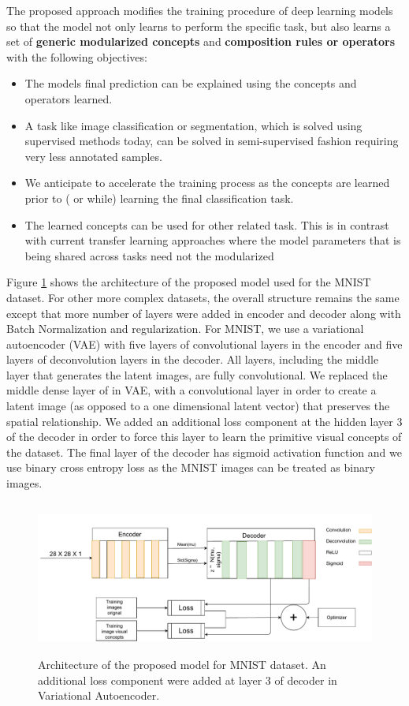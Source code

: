 \documentclass{JMLFS}
\begin{document}
The proposed approach modifies the training procedure of deep learning models so that the model not only learns to perform the specific task,  but also learns a set of \textbf{generic modularized concepts} and \textbf{composition rules or operators} with the following objectives:
\begin{itemize}
\item The models final prediction can be explained using the concepts and operators learned.
\item A task like image classification or segmentation, which is solved using supervised methods today, can be solved in semi-supervised fashion requiring very less annotated samples.
\item We anticipate to accelerate the training process as the concepts are learned prior to ( or while) learning the final classification task.
\item The learned concepts can be used for other related task. This is in contrast with current transfer learning approaches where the model parameters that is being shared across tasks need not the modularized
\end{itemize}

Figure \ref{f:cnn_arch} shows the architecture of the proposed model used for the MNIST dataset.
For other more complex datasets, the overall structure remains the same except that more number of layers were added in encoder and decoder along with Batch Normalization \cite{ioffe2015} and regularization.
For MNIST, we use a variational autoencoder (VAE) with five layers of convolutional layers in the encoder and five layers of deconvolution layers in the decoder.
All layers, including the middle layer that generates the latent images, are fully convolutional.
We replaced the middle dense layer of in VAE, with a convolutional layer in order to create a latent image (as opposed to a one dimensional latent vector) that preserves the spatial relationship.
We added an additional loss component at the hidden layer 3 of the decoder in order to force this layer to learn the primitive visual concepts of the dataset.
The final layer of the decoder has sigmoid activation function and we use binary cross entropy loss as the MNIST images can be treated as binary images.

\begin{figure}
\centering
\includegraphics[height=2in]{images/cnn_arch}
\caption{Architecture of the proposed model for MNIST dataset. An additional loss component were added at layer 3 of decoder in Variational Autoencoder.
}
\label{f:cnn_arch}
\end{figure}
\end{document}
